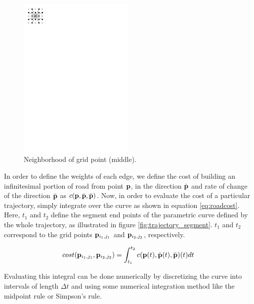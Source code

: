 \begin{figure}[ht]
\centering
\includegraphics[width=0.5\textwidth]{figure/neighbormask}
\caption{Neighborhood of grid point (middle).}
\label{fig:neighbormask}
\end{figure}

In order to define the weights of each edge, we define the cost of building an infinitesimal portion of road from point ${\mathbf p}$, in the direction $\dot{\mathbf p}$ and rate of change of the direction $\ddot{\mathbf p}$ as $c({\mathbf p}, \dot{{\mathbf p}}, \ddot{{\mathbf p}})$. Now, in order to evaluate the cost of a particular trajectory, simply integrate over the curve as shown in equation \ref{eq:roadcost}. Here, $t_1$ and $t_2$ define the segment end points of the parametric curve defined by the whole trajectory, as illustrated in figure \ref{fig:trajectory_segment}. $t_1$ and $t_2$ correspond to the grid points ${\mathbf p}_{i_1,j_1}$ and ${\mathbf p}_{i_2,j_2}$, respectively.

\begin{equation}
cost({\mathbf p}_{i_1,j_1}, {\mathbf p}_{i_2,j_2}) = \int_{t_1}^{t_2} c({\mathbf p}(t), \dot{{\mathbf p}}(t), \ddot{{\mathbf p}})(t) dt
\label{eq:roadcost}
\end{equation}

Evaluating this integral can be done numerically by discretizing the curve into intervals of length $\Delta t$ and using some numerical integration method like the midpoint rule or Simpson's rule.

